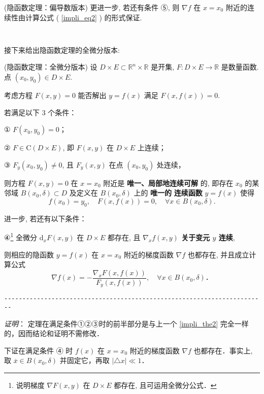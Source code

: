 \begin{theorem}{(隐函数定理：偏导数版本)}
更进一步, 若还有条件 ⑤, 则 $\nabla f$ 在 $x=x_{0}$ 附近的连续性由计算公式 ( \autoref{impli_eq2} ) 的形式保证. 
 \end{theorem}

\verb| |

接下来给出隐函数定理的全微分版本:
 \begin{theorem}{(隐函数定理：全微分版本)}
 设 $D\times E\subset\mathbb{R}^{n}\times\mathbb{R}$ 是开集, $F:D\times E\rightarrow\mathbb{R}$
是数量函数. 点 $(x_{0},y_{0})\in D\times E.$ 

考虑方程 $F(x,y)=0$ 能否解出 $y=f(x)$ 满足 $F(x,f(x))=0.$ 

若满足以下 3 个条件：

① $F(x_{0},y_{0})=0$；

② $F\in\mathrm{C}(D\times E)$, 即 $F(x,y)$ 在 $D\times E$ 上连续； 

③ $F_{y}(x_{0},y_{0})\neq0$, 且 $F_{y}(x,y)$ 在点 $(x_0,y_0)$ 处连续，

则方程 $F(x,y)=0$ 在 $x=x_{0}$ 附近是\textbf{ 唯一、局部地连续可解} 的, 即存在 $x_{0}$
的某邻域 $B(x_{0},\delta)\subset D$ 及定义在 $B(x_{0},\delta)$ 上的 \textbf{唯一的} \textbf{
连续函数} $y=f(x)$ 使得
\[
f(x_{0})=y_{0},\quad F(x,f(x))=0,\quad\forall x\in B(x_{0},\delta).
\]

进一步, 若还有以下条件：

④\footnote{说明梯度 $\nabla F(x,y)$ 在 $D\times E$ 都存在, 且可运用全微分公式．} 全微分 $\mathrm{d}_{x}F(x,y)$ 在 $D\times E$ 都存在, 且 \textbf{$\nabla_x f(x,y)$ 关于变元 $y$ 连续},

则相应的隐函数 $y=f(x)$ 在 $x=x_{0}$ 附近的梯度函数 $\nabla f$ 也都存在, 并且成立计算公式
\[
\nabla f(x)=-{\displaystyle \frac{\nabla_{x}F(x,f(x))}{F_{y}(x,f(x))}},\quad\forall x\in B(x_{0},\delta)．
\]

\verb|------------------------------------------------------------------------|

\textsl{证明}： 定理在满足条件①②③时的前半部分是与上一个 \autoref{impli_the2} 完全一样的，因而结论和证明不需修改．

下证在满足条件 ④ 时 $f(x)$ 在 $x=x_{0}$ 附近的梯度函数 $\nabla f$ 也都存在．事实上, 取 $\overline{x}\in B(x_{0},\delta)$ 并固定它，再取 $\left|\triangle x\right|\ll1$． %


\end{theorem}
